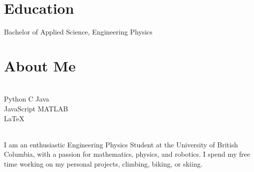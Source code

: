 \documentclass[]{deedy-resume-openfont}
\begin{document}
	\section{Education}
	\begin{tightemize}
		\item Bachelor of Applied Science, Engineering Physics \\
	\end{tightemize}
	\vspace{8pt}
	
	\section{About Me}
	\begin{minipage}[t]{.35\textwidth}
		 \\
		Python \textbullet{} C \textbullet{} Java \\
		JavaScript \textbullet{} MATLAB \\
		\LaTeX
		\vspace{8pt}
	\end{minipage}
	\hfill
	\begin{minipage}[t]{.55\textwidth}
		 \\
		I am an enthusiastic Engineering Physics Student at the University of British Columbia, with a passion for mathematics, physics, and robotics. I spend my free time working on my personal projects, climbing, biking, or skiing.
	\end{minipage}
	
\end{document}
